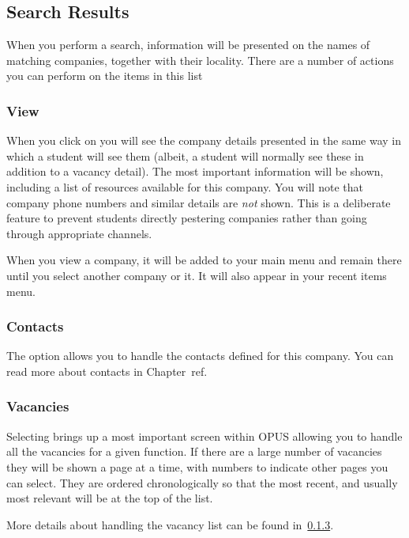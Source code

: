 \documentclass[12 pt]{book}
\begin{document}
\subsection{Search Results}

When you perform a search, information will be presented on the names of
matching companies, together with their locality. There are a number of 
actions you can perform on the items in this list

\subsubsection{View}

When you click on  you will see the company details presented
in the same way in which a student will see them (albeit, a student will
normally see these in addition to a vacancy detail). The most important
information will be shown, including a list of resources available for this
company. You will note that company phone numbers and similar details are
\emph{not} shown. This is a deliberate feature to prevent students directly
pestering companies rather than going through appropriate channels.

When you view a company, it will be added to your main menu and remain there
until you select another company or  it. It will also appear
in your recent items menu.

\subsubsection{Contacts}

The  option allows you to handle the contacts defined for
this company. You can read more about contacts in Chapter~ref{}.

\subsubsection{Vacancies}

Selecting  brings up a most important screen within OPUS
allowing you to handle all the vacancies for a given function. If there are
a large number of vacancies they will be shown a page at a time, with numbers
to indicate other pages you can select. They are ordered chronologically so
that the most recent, and usually most relevant will be at the top of the
list.

More details about handling the vacancy list can be found in~\ref{}.
\end{document}
